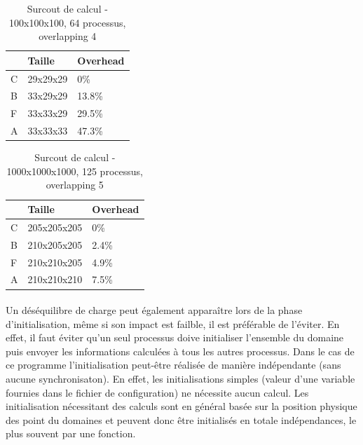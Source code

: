 \begin{table}[h]
  \begin{center}
    \begin{tabular}{|P{2cm}|P{3.5cm}|P{3.5cm}|}
      \hline
      & Taille & Overhead \\ \hline
      C & 29x29x29 & 0\%  \\ \hline
      B & 33x29x29 & 13.8\%  \\ \hline
      F & 33x33x29 & 29.5\%  \\ \hline
      A & 33x33x33 & 47.3\%  \\ \hline      
    \end{tabular}
    \caption{\label{arr:overlap_res}Surcout de calcul - 100x100x100, 64 processus, overlapping 4}
  \end{center}
\end{table}


\begin{table}[h]
  \begin{center}
    \begin{tabular}{|P{2cm}|P{3.5cm}|P{3.5cm}|}
      \hline
      & Taille & Overhead \\ \hline
      C & 205x205x205 & 0\%    \\ \hline
      B & 210x205x205 & 2.4\%  \\ \hline
      F & 210x210x205 & 4.9\%  \\ \hline
      A & 210x210x210 & 7.5\%  \\ \hline      
    \end{tabular}
    \caption{\label{arr:overlap_res_big}Surcout de calcul - 1000x1000x1000, 125 processus, overlapping 5}
  \end{center}
\end{table}


\paragraph{}Un déséquilibre de charge peut également apparaître lors de la phase d'initialisation, même si son impact est failble, il est préférable de l'éviter. En effet, il faut éviter qu'un seul processus doive initialiser l'ensemble du domaine puis envoyer les informations calculées à tous les autres processus. Dans le cas de ce programme l'initialisation peut-être réalisée de manière indépendante (sans aucune synchronisaton). En effet, les initialisations simples (valeur d'une variable fournies dans le fichier de configuration) ne nécessite aucun calcul. Les initialisation nécessitant des calculs sont en général basée sur la position physique des point du domaines et peuvent donc être initialisés en totale indépendances, le plus souvent par une fonction.

